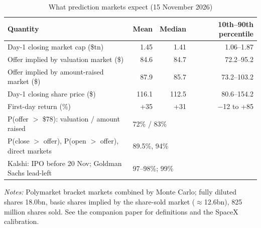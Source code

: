 \begin{table}[!htbp]\centering\footnotesize
\caption{What prediction markets expect (15 November 2026)}\label{tab:s11}

\begin{threeparttable}
\begin{tabular}{lrrr}
\toprule
Quantity & Mean & Median & 10th--90th percentile \\
\midrule
Day-1 closing market cap (\$tn) & 1.45 & 1.41 & 1.06--1.87 \\
Offer implied by valuation market (\$) & 84.6 & 84.7 & 72.2--95.2 \\
Offer implied by amount-raised market (\$) & 87.9 & 85.7 & 73.2--103.2 \\
Day-1 closing share price (\$) & 116.1 & 112.5 & 80.6--154.2 \\
First-day return (\%) & +35 & +31 & $-$12 to +85 \\
P(offer $>$ \$78): valuation / amount raised & \multicolumn{3}{l}{72\% / 83\%} \\
P(close $>$ offer), P(open $>$ offer), direct markets & \multicolumn{3}{l}{89.5\%, 94\%} \\
Kalshi: IPO before 20 Nov; Goldman Sachs lead-left & \multicolumn{3}{l}{97--98\%; 99\%} \\
\bottomrule
\end{tabular}
\begin{tablenotes}[flushleft]\footnotesize
\item \textit{Notes:} Polymarket bracket markets combined by Monte Carlo; fully diluted shares 18.0bn, basic shares implied by the share-sold market ($\approx$12.6bn), 825 million shares sold. See the companion paper for definitions and the SpaceX calibration.
\end{tablenotes}
\end{threeparttable}

\end{table}
